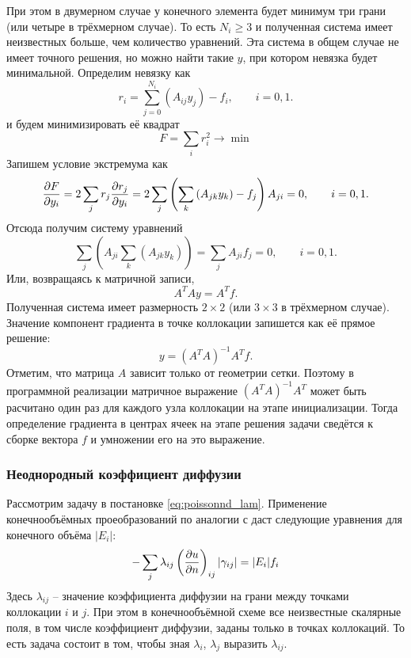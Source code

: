 При этом в двумерном случае у конечного элемента будет минимум три грани (или четыре в трёхмерном случае). То есть $N_i \geq 3$ 
и полученная система имеет неизвестных больше, чем количество уравнений.
Эта система в общем случае не имеет точного решения,
но можно найти такие $y$, при котором невязка будет минимальной.
Определим невязку как 
$$
r_i = \sum_{j=0}^{N_i}\left(A_{ij}y_j\right) - f_i, \qquad i=0, 1.
$$
и будем минимизировать её квадрат
$$
F = \sum_i r_i^2 \to \min
$$
Запишем условие экстремума как
$$
\frac{\partial F}{\partial y_i} = 2 \sum_j r_j \frac{\partial r_j}{\partial y_i} =
               2 \sum_j \left( \sum_k \left( A_{jk} y_k\right) - f_j \right)A_{ji} = 0, \qquad i=0,1.
$$
Отсюда получим систему уравнений
$$
\sum_j \left( A_{ji} \sum_k \left( A_{jk} y_k\right) \right) = \sum_j A_{ji}f_j = 0, \qquad i=0,1.
$$
Или, возвращаясь к матричной записи,
$$
A^{T} A y = A^{T}f.
$$
Полученная система имеет размерность $2\times2$ (или $3\times3$ в трёхмерном случае).
Значение компонент градиента в точке коллокации запишется как её прямое решение:
$$
y = \left(A^T A\right)^{-1} A^T f.
$$
Отметим, что матрица $A$ зависит только от геометрии сетки.
Поэтому в программной реализации матричное выражение $\left(A^T A\right)^{-1} A^T $ может быть расчитано 
один раз для каждого узла коллокации на этапе инициализации.
Тогда определение градиента в центрах ячеек на этапе решения задачи 
сведётся к сборке вектора $f$ и умножении его на это выражение.

\subsubsection{Неоднородный коэффициент диффузии}
\label{sec:fvm_nonconst_lambda}
Рассмотрим задачу в постановке \cref{eq:poissonnd_lam}.
Применение конечнообъёмных проеобразований по аналогии с 
 даст следующие уравнения для конечного объёма $|E_i|$:
\begin{equation}
\label{eq:fvm_lambda_ij_scheme}
-\sum_j \lambda_{ij} \left(\frac{\partial u}{\partial n}\right)_{ij} |\gamma_{ij}| = |E_i| f_i
\end{equation}
Здесь $\lambda_{ij}$ -- значение коэффициента диффузии
на грани между точками коллокации $i$ и $j$.
При этом в конечнообъёмной схеме все неизвестные скалярные поля, в том числе коэффициент диффузии, заданы только
в точках коллокаций. То есть задача состоит в том, чтобы зная $\lambda_i$, $\lambda_j$ выразить $\lambda_{ij}$.

